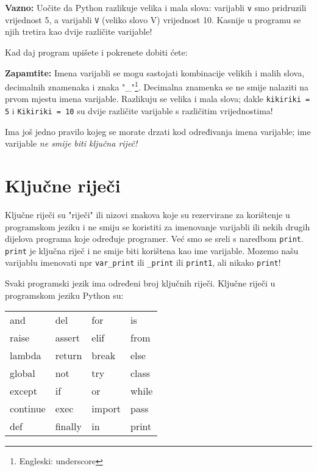 	\textbf{Vazno:} Uočite da Python razlikuje velika i mala
	slova: varijabli \verb+v+ smo
	pridruzili vrijednost 5, a varijabli \verb+V+ (veliko slovo V) vrijednost 10.
	Kasnije u programu se njih tretira kao dvije različite varijable!

	Kad daj program upišete i pokrenete dobiti ćete:


	\textbf{Zapamtite:} Imena varijabli se mogu sastojati kombinacije velikih i malih
	slova, decimalnih znamenaka
	i znaka "\_"\footnote{Engleski: underscore}. Decimalna znamenka se ne smije
	nalaziti na prvom mjestu imena varijable. Razlikuju se velika i mala slova; dakle
	\verb+kikiriki = 5+ i \verb+Kikiriki = 10+ su dvije različite varijable s
	različitim vrijednostima! 

	Ima još jedno pravilo kojeg se morate drzati kod određivanja imena
	varijable; ime varijable \emph{ne smije biti ključna riječ!}

\section{Ključne riječi}

	Ključne riječi su "riječi" ili nizovi znakova koje su rezervirane za
	korištenje u programskom jeziku i ne smiju se koristiti za imenovanje varijabli
	ili nekih drugih dijelova programa koje određuje programer. Već smo se
	sreli s  naredbom \verb+print+. \verb+print+ je ključna riječ i ne smije
	biti korištena kao ime varijable. Mozemo našu varijablu imenovati npr
	\verb+var_print+ ili \verb+_print+ ili \verb+print1+, ali nikako \verb+print+!

	Svaki programski jezik ima određeni broj ključnih riječi. Ključne
	riječi u programskom jeziku Python su:

\begin{center}
\begin{tabular}{llll}
and & del & for & is \\
raise & assert & elif & from\\
lambda & return & break & else\\
global & not & try & class\\
except & if & or & while\\
continue & exec & import & pass\\
def & finally & in & print
\end{tabular}
\end{center}

